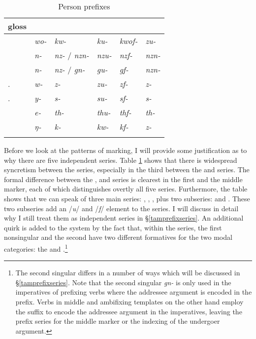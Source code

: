 \begin{table}
\caption{Person prefixes}
\label{perspref}
	\begin{tabularx}{\textwidth}{XXXXXl}
		\lsptoprule
		{gloss} &\Alph &\Bet &\Betaone &\Betatwo &\Gam\\\midrule
		\Fsg &\emph{wo-} &\emph{kw-} &\emph{ku-} &\emph{kwof-} &\emph{zu-}\\
		\Fnsg &\emph{n-} &\emph{nz-} / \emph{nzn-} &\emph{nzu-} &\emph{nzf-} &\emph{nzn-}\\
		\Ssg &\emph{n-}	&\emph{nz-} / \emph{gn-} &\emph{gu-} &\emph{gf-} &\emph{nzn-}\\
		\Tsg.\F &\emph{w-} &\emph{z-} &\emph{zu-} &\emph{zf-} &\emph{z-}\\
		\Tsg.\Masc &\emph{y-} &\emph{s-} &\emph{su-} &\emph{sf-} &\emph{s-}\\
		\Stnsg &\emph{e-} &\emph{th-} &\emph{thu-} &\emph{thf-} &\emph{th-}\\
		\M &\emph{ŋ-} &\emph{k-} &\emph{kw-} &\emph{kf-} &\emph{z-}\\
		\lspbottomrule
	\end{tabularx}
\end{table}%

Before we look at the patterns of  marking, I will provide some justification as to why there are five independent series. Table \ref{perspref} shows that there is widespread syncretism between the series, especially in the third  between the \Bet{} and \Gam{} series. The formal difference between the \Alph, \Bet{} and \Gam{} series is clearest in the first   and the middle marker, each of which distinguishes overtly all five series. Furthermore, the table shows that we can speak of three main series: \Alph, \Bet, \Gam{}, plus two subseries: \Betaone{} and \Betatwo. These two subseries add an /\emph{u}/ and /\emph{f}/ element to the \Bet{} series. I will discuss in detail why I still treat them as independent series in \S{}\ref{tamprefixseries}. An additional quirk is added to the system by the fact that, within the \Bet{} series, the first nonsingular and the second  have two different formatives for the two modal categories: the  and .\footnote{The second singular differs in a number of ways which will be discussed in \S{}\ref{tamprefixseries}. Note that the second singular \emph{gn-} is only used in the imperatives of prefixing verbs where the addressee argument is encoded in the prefix. Verbs in middle and ambifixing templates on the other hand employ the suffix to encode the addressee argument in the imperatives, leaving the prefix \Bet{} series for the middle marker or the indexing of the undergoer argument.}%

